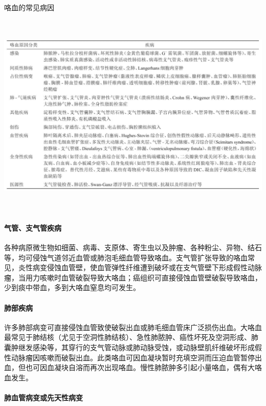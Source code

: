 \begin{table}[htbp]
\centering
\caption{咯血的常见病因}
\label{tab9-1}
\includegraphics[width=6.59375in,height=3.875in]{./images/Image00045.jpg}
\end{table}

\paragraph{气管、支气管疾病}

各种病原微生物如细菌、病毒、支原体、寄生虫以及肿瘤、各种粉尘、异物、结石等，均可侵蚀气道邻近血管或肺泡毛细血管导致咯血。支气管扩张导致的咯血常见，炎性病变侵蚀血管壁，使血管弹性纤维遭到破坏或在支气管壁下形成假性动脉瘤，当用力咳嗽时血管破裂导致大咯血；癌组织可直接侵蚀血管壁破裂导致咯血，少到痰中带血，多到大咯血窒息均可发生。

\paragraph{肺部疾病}

许多肺部病变可直接侵蚀血管致使破裂出血或肺毛细血管床广泛损伤出血。大咯血最常见于肺结核（尤见于空洞性肺结核）、急性肺脓肿、癌性坏死及空洞形成、肺囊肿继发感染等，其穿行的支气管动脉或肺动脉受蚀，或动脉壁肌纤维破坏形成假性动脉瘤因咳嗽而破裂出血。此类咯血可因血凝块暂时充填空洞而压迫血管暂停出血，但也可因血凝块自溶而再次出现咯血。慢性肺脓肿多引起小量咯血，偶有大咯血发生。

\paragraph{肺血管病变或先天性病变}

